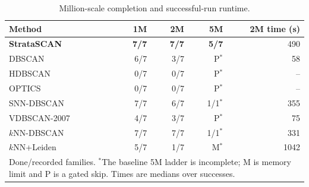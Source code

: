 \begin{table}[t]
\caption{Million-scale completion and successful-run runtime.}
\label{tab:million-scale}
\centering
\footnotesize
\setlength{\tabcolsep}{2.7pt}
\begin{tabular}{@{}lrrrr@{}}
\toprule
Method & 1M & 2M & 5M & 2M time (s)\\
\midrule
\textbf{StrataSCAN} & \textbf{7/7} & \textbf{7/7} & \textbf{5/7} & 490\\
DBSCAN & 6/7 & 3/7 & P$^{*}$ & 58\\
HDBSCAN & 0/7 & 0/7 & P$^{*}$ & --\\
OPTICS & 0/7 & 0/7 & P$^{*}$ & --\\
SNN-DBSCAN & 7/7 & 6/7 & 1/1$^{*}$ & 355\\
VDBSCAN-2007 & 4/7 & 3/7 & P$^{*}$ & 75\\
$k$NN-DBSCAN & 7/7 & 7/7 & 1/1$^{*}$ & 331\\
$k$NN+Leiden & 5/7 & 1/7 & M$^{*}$ & 1042\\
\bottomrule
\multicolumn{5}{p{0.95\columnwidth}}{\scriptsize Done/recorded families. $^{*}$The baseline 5M ladder is incomplete; M is memory limit and P is a gated skip. Times are medians over successes.}
\end{tabular}
\end{table}
